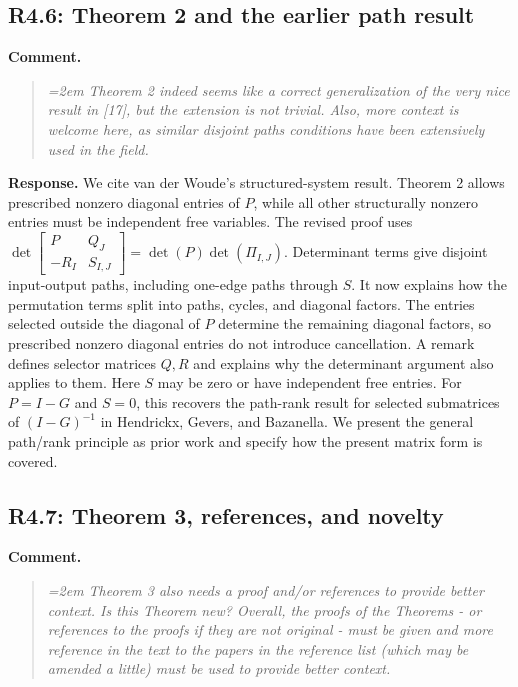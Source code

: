 \documentclass[11pt]{article}
\begin{document}
\subsection*{R4.6: Theorem 2 and the earlier path result}
\textbf{Comment.}
\begin{quote}\itshape\emergencystretch=2em
Theorem 2 indeed seems like a correct generalization of the very nice result in [17], but the extension is not trivial. Also, more context is welcome here, as similar disjoint paths conditions have been extensively used in the field. 
\end{quote}

\textbf{Response.} We cite van der Woude's structured-system result.
Theorem 2 allows prescribed nonzero diagonal entries of $P$, while all
other structurally nonzero entries must be independent free variables.
The revised proof uses
$\det\!\begin{bmatrix}P&Q_J\\-R_I&S_{I,J}\end{bmatrix}
=\det(P)\det(\Pi_{I,J})$. Determinant terms give disjoint input-output
paths, including one-edge paths through $S$. It now explains how the
permutation terms split into paths, cycles, and diagonal factors.
The entries selected outside the diagonal of $P$ determine the remaining
diagonal factors, so prescribed nonzero diagonal entries do not introduce
cancellation. A remark defines selector matrices $Q,R$ and explains why
the determinant argument also applies to them. Here $S$ may be zero or
have independent free entries. For $P=I-G$ and $S=0$, this recovers the
path-rank result for selected submatrices of $(I-G)^{-1}$ in Hendrickx,
Gevers, and Bazanella. We present the
general path/rank principle as prior work and specify how the present
matrix form is covered.

\subsection*{R4.7: Theorem 3, references, and novelty}
\textbf{Comment.}
\begin{quote}\itshape\emergencystretch=2em
Theorem 3 also needs a proof and/or references to provide better context. Is this Theorem new? Overall, the proofs of the Theorems - or references to the proofs if they are not original - must be given and more reference in the text to the papers in the reference list (which may be amended a little) must be used to provide better context.
\end{quote}
\end{document}
